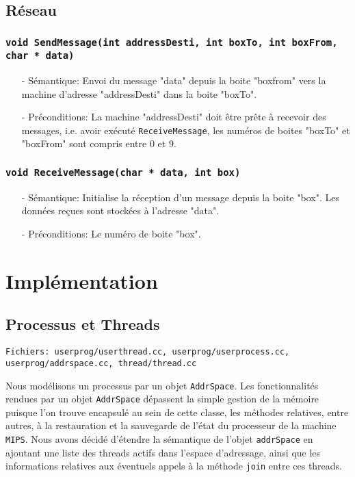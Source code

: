 \documentclass[11pt]{article}
\theoremstyle{definition}
\theoremstyle{definition}
\begin{document}
\subsection{Réseau}

\subsubsection{\texttt{void SendMessage(int addressDesti, int boxTo, int boxFrom, char * data)}}
\begin{itemize}
\item[-]Sémantique: Envoi du message "data" depuis la boite
 "boxfrom" vers la machine d'adresse "addressDesti" dans la boite "boxTo".
\item[-]Préconditions: La machine "addressDesti" doit être prête à recevoir des messages,
  i.e. avoir exécuté \texttt{ReceiveMessage}, les numéros de boites "boxTo" et "boxFrom" sont compris entre $0$ et $9$.
\end{itemize}

\subsubsection{\texttt{void ReceiveMessage(char * data, int box)}}
\begin{itemize}
\item[-]Sémantique: Initialise la réception d'un message depuis la boite "box".
  Les données reçues sont stockées à l'adresse "data".
\item[-]Préconditions: Le numéro de boite "box".
\end{itemize}


\section{Implémentation}

\subsection{Processus et Threads}

\begin{lstlisting}
Fichiers: userprog/userthread.cc, userprog/userprocess.cc, userprog/addrspace.cc, thread/thread.cc
\end{lstlisting}

Nous modélisons un processus par un objet \texttt{AddrSpace}.
Les fonctionnalités rendues par un objet \texttt{AddrSpace} dépassent la simple gestion de la mémoire puisque l'on trouve encapsulé au sein de cette classe, les méthodes relatives, entre autres, à la restauration et la sauvegarde de l'état du processeur de la machine \texttt{MIPS}.
Nous avons décidé d'étendre la sémantique de l'objet \texttt{addrSpace} en ajoutant une liste des threads actifs dans l'espace d'adressage, ainsi que les informations relatives aux éventuels appels à la méthode \texttt{join} entre ces threads.
\end{document}
